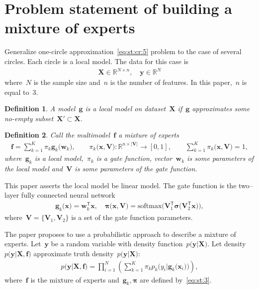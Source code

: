 \documentclass[12pt, twoside]{article}
\newtheorem{definition}{Definition}[section]
\numberwithin{equation}{section}
\begin{document}
\section{Problem statement of building a mixture of experts}
Generalize one-circle approximation~\eqref{eq:st:cr:5} problem to the case of several circles.
Each circle is a local model.
The data for this case is
\[
\label{eq:st:1}
\begin{aligned}
\textbf{X} \in \mathbb{R}^{N \times n}, \quad \textbf{y}\in \mathbb{R}^{N}
\end{aligned}
\]
where~$N$ is the sample size and~$n$ is the number of features. In this paper,~$n$ is equal to~$3$.

\begin{definition}
\label{def:1}
A model~$\mathbf{g}$ is a local model on dataset~$\textbf{X}$ if~$\mathbf{g}$ approximates some no-empty subset~$\textbf{X}'\subset\textbf{X}$.
\end{definition}

\begin{definition}
\label{def:2}
Call the multimodel~$\mathbf{f}$ a mixture of experts
\[
\label{eq:st:2}
\begin{aligned}
\mathbf{f} = \sum_{k=1}^{K}\pi_{k}\mathbf{g}_k\bigr(\mathbf{w}_k\bigr), \qquad \pi_{k}\bigr(\mathbf{x}, \mathbf{V}\bigr):\mathbb{R}^{n\times \left|\mathbf{V}\right|} \to [0, 1], \qquad \sum_{k=1}^{K}\pi_{k}\bigr(\mathbf{x}, \mathbf{V}\bigr) = 1,
\end{aligned}
\]
where~$\mathbf{g}_k$ is a local model,~$\pi_k$ is a gate function, vector~$\mathbf{w}_k$ is some parameters of the local model and~$\mathbf{V}$ is some parameters of the gate function.
\end{definition}

This paper asserts the local model be linear model. The gate function is the two--layer fully connected neural network
\[
\label{eq:st:3}
\begin{aligned}
\mathbf{g}_k\bigr(\textbf{x}\bigr) = \textbf{w}_k^{\mathsf{T}}\textbf{x}, \quad
\bm{\pi}\bigr(\mathbf{x}, \mathbf{V}\bigr) = \text{softmax}\bigr(\mathbf{V}_{1}^{\mathsf{T}}\bm{\sigma}\bigr(\mathbf{V}_2^{\mathsf{T}}\mathbf{x}\bigr)\bigr),
\end{aligned}
\]
where~$\mathbf{V} = \bigr\{\mathbf{V}_1, \mathbf{V}_2\bigr\}$ is a set of the gate function parameters.

The paper proposes to use a probabilistic approach to describe a mixture of experts. Let~$\textbf{y}$ be a random variable with density function~$p\bigr(\textbf{y}|\textbf{X}\bigr)$. Let density~$p\bigr(\textbf{y}|\textbf{X}, \textbf{f}\bigr)$ approximate truth density~$p\bigr(\textbf{y}|\textbf{X}\bigr)$:
\[
\label{eq:st:new:1}
\begin{aligned}
p\bigr(\textbf{y}|\textbf{X}, \textbf{f}\bigr) = \prod_{i=1}^{N}\left(\sum_{k=1}^{K}\pi_kp_{k}\bigr(y_{i}|\textbf{g}_{k}\bigr(\mathbf{x}_{i}\bigr)\bigr)\right),
\end{aligned}
\]
where~$\textbf{f}$ is the mixture of experts and~$\textbf{g}_k, \bm{\pi}$ are defined by~\eqref{eq:st:3}.
\end{document}
